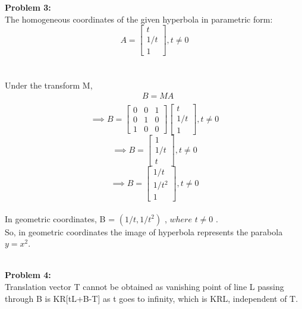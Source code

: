 \documentclass[a4paper]{article}
\begin{document}
\maketitle
\hrulefill
\\ \\
\textbf{Problem 3:} \\
The homogeneous coordinates of the given hyperbola in parametric form:
\[
A = 
\begin{bmatrix}
t \\
1/t \\
1
\end{bmatrix}
, t \neq 0 \]
\\  \\
Under the transform M,
\begin{equation*}
\begin{split}
& B = MA \\
\end{split}
\end{equation*}
\[
\implies
B =
\begin{bmatrix}
    0 & 0 & 1  \\
    0 & 1 & 0  \\
    1 & 0 & 0
    \end{bmatrix}
    \begin{bmatrix}
    t \\
    1/t \\
    1
    \end{bmatrix}
    , t \neq 0 
\]
\[
\implies
B = 
\begin{bmatrix}
1 \\ 
1/t \\
t
\end{bmatrix}
, t \neq 0
\]
\[
\implies
B = 
\begin{bmatrix}
1/t \\ 
1/t^2 \\
1
\end{bmatrix}
, t \neq 0
\]
\\
In geometric coordinates, B = $ (1/t, 1/t^2)$ , $ where $ $ t \neq 0 $ . \\
So, in geometric coordinates the image of hyperbola represents the parabola $ y = x^2. $  

\hrulefill\\

\textbf{Problem 4:} \\


Translation vector T cannot be obtained as vanishing point of line L passing through B is KR[tL+B-T] as t goes to infinity, which is KRL, independent of T.
\end{document}
